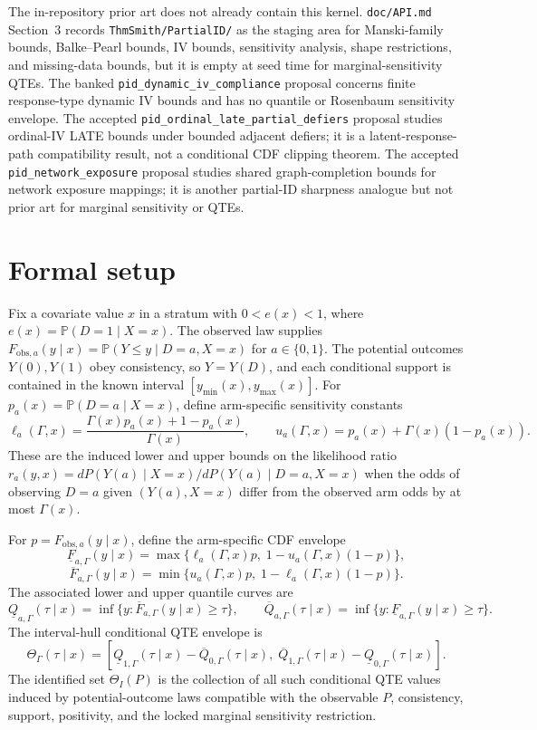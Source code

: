 \documentclass[11pt]{article}
\renewcommand{\Pr}{\mathbb{P}}
\theoremstyle{definition}
\theoremstyle{plain}
\theoremstyle{remark}
\begin{document}
The in-repository prior art does not already contain this kernel.  \texttt{doc/API.md} Section~3 records \texttt{ThmSmith/PartialID/} as the staging area for Manski-family bounds, Balke--Pearl bounds, IV bounds, sensitivity analysis, shape restrictions, and missing-data bounds, but it is empty at seed time for marginal-sensitivity QTEs.  The banked \texttt{pid\_dynamic\_iv\_compliance} proposal concerns finite response-type dynamic IV bounds and has no quantile or Rosenbaum sensitivity envelope.  The accepted \texttt{pid\_ordinal\_late\_partial\_defiers} proposal studies ordinal-IV LATE bounds under bounded adjacent defiers; it is a latent-response-path compatibility result, not a conditional CDF clipping theorem.  The accepted \texttt{pid\_network\_exposure} proposal studies shared graph-completion bounds for network exposure mappings; it is another partial-ID sharpness analogue but not prior art for marginal sensitivity or QTEs.

\section{Formal setup}
Fix a covariate value \(x\) in a stratum with \(0<e(x)<1\), where \(e(x)=\Pr(D=1\mid X=x)\).  The observed law supplies \(F_{\mathrm{obs},a}(y\mid x)=\Pr(Y\le y\mid D=a,X=x)\) for \(a\in\{0,1\}\).  The potential outcomes \(Y(0),Y(1)\) obey consistency, so \(Y=Y(D)\), and each conditional support is contained in the known interval \([y_{\min}(x),y_{\max}(x)]\).  For \(p_a(x)=\Pr(D=a\mid X=x)\), define arm-specific sensitivity constants
\[
\ell_a(\Gamma,x)=\frac{\Gamma(x)p_a(x)+1-p_a(x)}{\Gamma(x)},\qquad
u_a(\Gamma,x)=p_a(x)+\Gamma(x)(1-p_a(x)).
\]
These are the induced lower and upper bounds on the likelihood ratio \(r_a(y,x)=dP(Y(a)\mid X=x)/dP(Y(a)\mid D=a,X=x)\) when the odds of observing \(D=a\) given \((Y(a),X=x)\) differ from the observed arm odds by at most \(\Gamma(x)\).

For \(p=F_{\mathrm{obs},a}(y\mid x)\), define the arm-specific CDF envelope
\[
\underline F_{a,\Gamma}(y\mid x)
=\max\{\ell_a(\Gamma,x)p,\;1-u_a(\Gamma,x)(1-p)\},
\]
\[
\overline F_{a,\Gamma}(y\mid x)
=\min\{u_a(\Gamma,x)p,\;1-\ell_a(\Gamma,x)(1-p)\}.
\]
The associated lower and upper quantile curves are
\[
\underline Q_{a,\Gamma}(\tau\mid x)=\inf\{y:\overline F_{a,\Gamma}(y\mid x)\ge \tau\},\qquad
\overline Q_{a,\Gamma}(\tau\mid x)=\inf\{y:\underline F_{a,\Gamma}(y\mid x)\ge \tau\}.
\]
The interval-hull conditional QTE envelope is
\[
\Theta_{\Gamma}(\tau\mid x)=
[\underline Q_{1,\Gamma}(\tau\mid x)-\overline Q_{0,\Gamma}(\tau\mid x),\;
 \overline Q_{1,\Gamma}(\tau\mid x)-\underline Q_{0,\Gamma}(\tau\mid x)].
\]
The identified set \(\Theta_I(P)\) is the collection of all such conditional QTE values induced by potential-outcome laws compatible with the observable \(P\), consistency, support, positivity, and the locked marginal sensitivity restriction.
\end{document}

